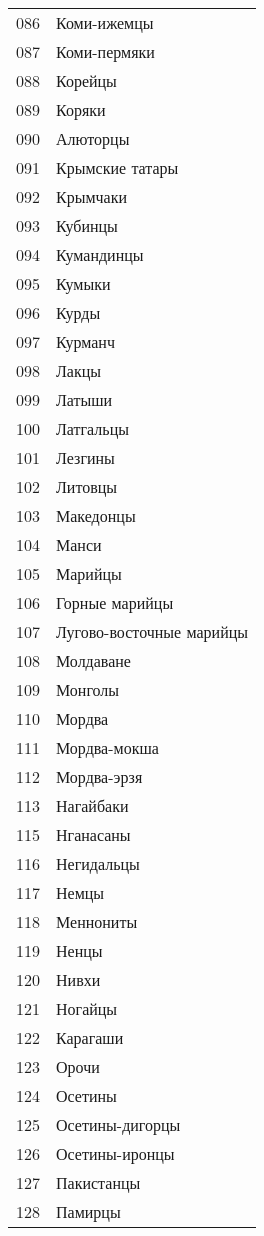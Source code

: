\documentclass[10pt, a4paper, titlepage]{article}
\begin{document}
\begin{xtabular}{rp{.38\textwidth}}
    086 & Коми-ижемцы \\
    087 & Коми-пермяки \\
    088 & Корейцы \\
    089 & Коряки \\
    090 & Алюторцы \\
    091 & Крымские татары \\
    092 & Крымчаки \\
    093 & Кубинцы \\
    094 & Кумандинцы \\
    095 & Кумыки \\
    096 & Курды \\
    097 & Курманч \\
    098 & Лакцы \\
    099 & Латыши \\
    100 & Латгальцы \\
    101 & Лезгины \\
    102 & Литовцы \\
    103 & Македонцы \\
    104 & Манси \\
    105 & Марийцы \\
    106 & Горные марийцы \\
    107 & Лугово-восточные марийцы \\
    108 & Молдаване \\
    109 & Монголы \\
    110 & Мордва \\
    111 & Мордва-мокша \\
    112 & Мордва-эрзя \\
    113 & Нагайбаки \\
    115 & Нганасаны \\
    116 & Негидальцы \\
    117 & Немцы \\
    118 & Меннониты \\
    119 & Ненцы \\
    120 & Нивхи \\
    121 & Ногайцы \\
    122 & Карагаши \\
    123 & Орочи \\
    124 & Осетины \\
    125 & Осетины-дигорцы \\
    126 & Осетины-иронцы \\
    127 & Пакистанцы \\
    128 & Памирцы \\

\end{xtabular}
\end{document}
